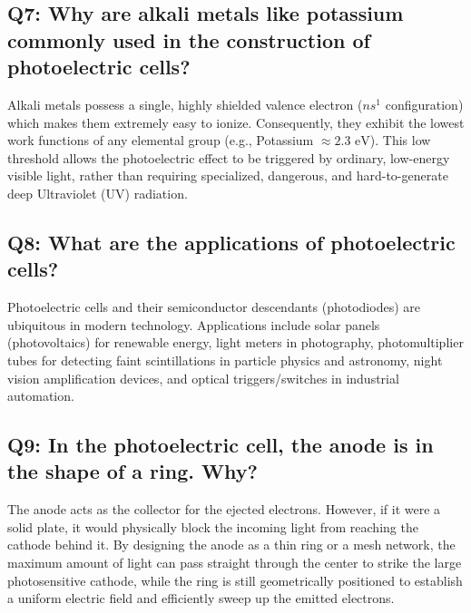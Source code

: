 \documentclass[a4paper,11pt]{article}
\begin{document}
\subsection*{Q7: Why are alkali metals like potassium commonly used in the construction of photoelectric cells?}
Alkali metals possess a single, highly shielded valence electron ($ns^1$ configuration) which makes them extremely easy to ionize. Consequently, they exhibit the lowest work functions of any elemental group (e.g., Potassium $\approx 2.3\text{ eV}$). This low threshold allows the photoelectric effect to be triggered by ordinary, low-energy visible light, rather than requiring specialized, dangerous, and hard-to-generate deep Ultraviolet (UV) radiation.

\subsection*{Q8: What are the applications of photoelectric cells?}
Photoelectric cells and their semiconductor descendants (photodiodes) are ubiquitous in modern technology. Applications include solar panels (photovoltaics) for renewable energy, light meters in photography, photomultiplier tubes for detecting faint scintillations in particle physics and astronomy, night vision amplification devices, and optical triggers/switches in industrial automation.

\subsection*{Q9: In the photoelectric cell, the anode is in the shape of a ring. Why?}
The anode acts as the collector for the ejected electrons. However, if it were a solid plate, it would physically block the incoming light from reaching the cathode behind it. By designing the anode as a thin ring or a mesh network, the maximum amount of light can pass straight through the center to strike the large photosensitive cathode, while the ring is still geometrically positioned to establish a uniform electric field and efficiently sweep up the emitted electrons.
\end{document}
